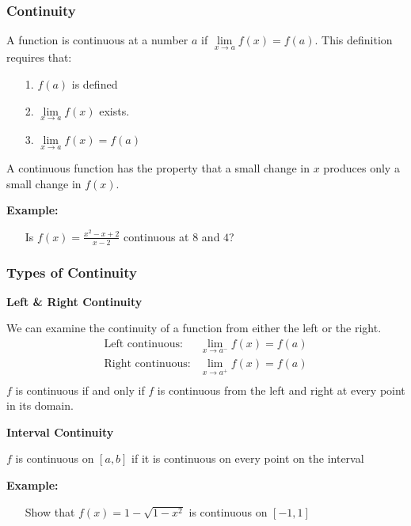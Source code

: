 \documentclass{beamer}
\begin{document}
\begin{frame}
\frametitle{\textbf{Continuity}}
A function is continuous at a number $a$ if $\lim\limits_{x \to a}f(x)=f(a)$. This definition requires that:
\begin{itemize}
	\item[1.] $f(a)$ is defined
	\item[2.]$\lim\limits_{x \to a}f(x)$ exists.
	\item[3.]$\lim\limits_{x \to a}f(x)=f(a)$
\end{itemize}
A continuous function has the property that a small change in $x$ produces only a small change in $f(x)$.

\vspace{12pt}

\textbf{Example:}
\begin{itemize}
	\item[] Is $f(x) = \frac{x^2-x+2}{x-2}$ continuous at $8$ and $4$?
\end{itemize}
\end{frame}

\begin{frame}
\frametitle{\textbf{Types of Continuity}}
\textbf{Left \& Right Continuity}

We can examine the continuity of a function from either the left or the right.
\begin{eqnarray*}
	\mbox{Left continuous}: & \lim\limits_{x \to a^-} f(x) = f(a)\\
	\mbox{Right continuous}: & \lim\limits_{x \to a^+} f(x) = f(a)\\
\end{eqnarray*}$f$ is continuous if and only if $f$ is continuous from the left and right at every point in its domain.
\vspace{12pt}

\textbf{Interval Continuity}

$f$ is continuous on $[a,b]$ if it is continuous on every point on the interval

\vspace{12pt}

\textbf{Example:}
\begin{itemize}
	\item[] Show that $f(x) = 1-\sqrt{1-x^2}$ is continuous on $[-1,1]$
\end{itemize}
\end{frame}
\end{document}
